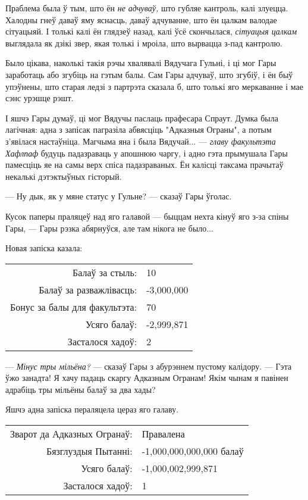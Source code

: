 Праблема была ў тым, што ён \emph{не адчуваў,} што губляе кантроль, калі злуецца.
Халодны гнеў даваў яму яснасць, даваў адчуванне, што ён цалкам валодае сітуацыяй.
І толькі калі ён глядзеў назад, калі ўсё скончылася, \emph{сітуацыя цалкам}
выглядала як дзікі звер, якая толькі і мроіла, што вырвацца з-пад кантролю.

Было цікава, наколькі такія рэчы хвалявалі Вядучага Гульні, і ці мог Гары 
заработаць або згубіць на гэтым балы. Сам Гары адчуваў, што згубіў, і 
ён быў упэўнены, што старая ледзі з партрэта сказала б, што толькі яго меркаванне 
і мае сэнс урэшце рэшт. 

І яшчэ Гары думаў, ці мог Вядучы паслаць прафесара Спраут. Думка была лагічная:
адна з запісак пагразіла абвясціць "Адказныя Ограны", а потым з'явілася настаўніца.
Магчыма яна і была Вядучай... ---  \emph{главу факультэта Хафлпаф} будуць падазраваць 
у апошнюю чаргу, і адно гэта прымушала Гары памесціць яе на самы верх спіса падазраваных.
Ён калісці таксама прачытаў некалькі дэтэктыўных гісторый.

--- Ну дык, як у мяне статус у Гульне? --- сказаў Гары ўголас.

Кусок паперы праляцеў над яго галавой --- быццам нехта кінуў яго з-за спіны Гары, ---
Гары рэзка абярнуўся, але там нікога не было...

Новая запіска казала: 


\begin{writtenNoteGame}
\begin{tabular}{rl}
Балаў за стыль: & 10\\
Балаў за разважлівасць: & -3,000,000\\
Бонус за балы для факультэта: & 70\\
Усяго балаў: & -2,999,871\\
Засталося хадоў: & 2
\end{tabular}
\end{writtenNoteGame}

--- \emph{Мінус тры мільёна?} --- сказаў Гары з абурэннем пустому калідору. --- 
Гэта ўжо занадта! Я хачу падаць скаргу Адказным Огранам! Якім чынам я павінен 
адрабіць тры мільёны балаў за два хады?

Яшчэ адна запіска пераляцела цераз яго галаву.

\begin{writtenNoteGame}
\begin{tabular}{rl}
Зварот да Адказных Огранаў: & Правалена\\
Бязглуздыя Пытанні: & -1,000,000,000,000 балаў\\
Усяго балаў: & -1,000,002,999,871\\
Засталося хадоў: & 1
\end{tabular}
\end{writtenNoteGame}

